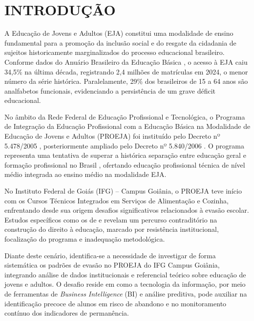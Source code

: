 \documentclass[12pt,a4paper]{article}
\begin{document}
\section{INTRODUÇÃO}

A Educação de Jovens e Adultos (EJA) constitui uma modalidade de ensino fundamental para a promoção da inclusão social e do resgate da cidadania de sujeitos historicamente marginalizados do processo educacional brasileiro. Conforme dados do Anuário Brasileiro da Educação Básica \cite{todos2025}, o acesso à EJA caiu 34,5\% na última década, registrando 2,4 milhões de matrículas em 2024, o menor número da série histórica. Paralelamente, 29\% dos brasileiros de 15 a 64 anos são analfabetos funcionais, evidenciando a persistência de um grave déficit educacional.

No âmbito da Rede Federal de Educação Profissional e Tecnológica, o Programa de Integração da Educação Profissional com a Educação Básica na Modalidade de Educação de Jovens e Adultos (PROEJA) foi instituído pelo Decreto nº 5.478/2005 \cite{mec2005}, posteriormente ampliado pelo Decreto nº 5.840/2006 \cite{mec2006}. O programa representa uma tentativa de superar a histórica separação entre educação geral e formação profissional no Brasil \cite{frignotto2005}, ofertando educação profissional técnica de nível médio integrada ao ensino médio na modalidade EJA.

No Instituto Federal de Goiás (IFG) -- Campus Goiânia, o PROEJA teve início com os Cursos Técnicos Integrados em Serviços de Alimentação e Cozinha, enfrentando desde sua origem desafios significativos relacionados à evasão escolar. Estudos específicos como os de  e  revelam um percurso contraditório na construção do direito à educação, marcado por resistência institucional, focalização do programa e inadequação metodológica.

Diante deste cenário, identifica-se a necessidade de investigar de forma sistemática os padrões de evasão no PROEJA do IFG Campus Goiânia, integrando análise de dados institucionais e referencial teórico sobre educação de jovens e adultos. O desafio reside em como a tecnologia da informação, por meio de ferramentas de \textit{Business Intelligence} (BI) e análise preditiva, pode auxiliar na identificação precoce de alunos em risco de abandono e no monitoramento contínuo dos indicadores de permanência.
\end{document}
